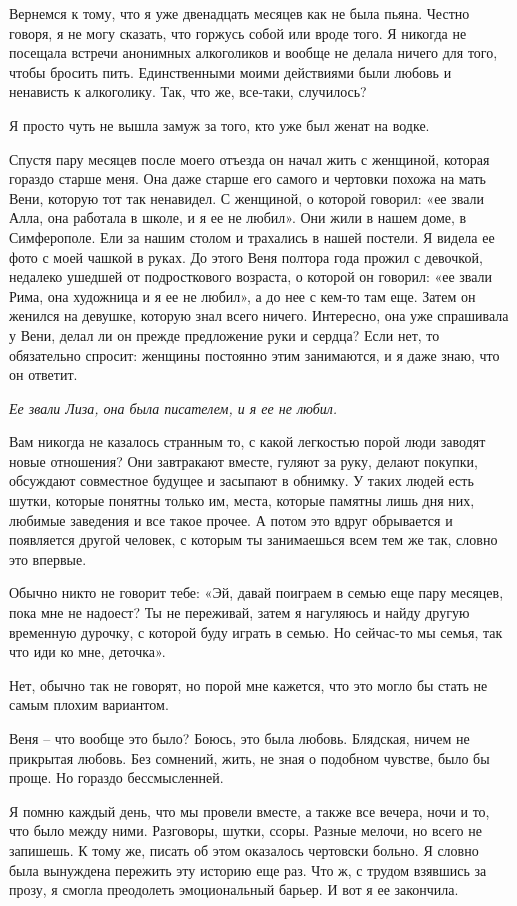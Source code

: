\documentclass[
]{book}
\begin{document}
Вернемся к тому, что я уже двенадцать месяцев как не была пьяна. Честно говоря, я не могу сказать, что горжусь собой или вроде того. Я никогда не посещала встречи анонимных алкоголиков и вообще не делала ничего для того, чтобы бросить пить. Единственными моими действиями были любовь и ненависть к алкоголику. Так, что же, все-таки, случилось?

Я просто чуть не вышла замуж за того, кто уже был женат на водке.

Спустя пару месяцев после моего отъезда он начал жить с женщиной, которая гораздо старше меня. Она даже старше его самого и чертовки похожа на мать Вени, которую тот так ненавидел. С женщиной, о которой говорил: «ее звали Алла, она работала в школе, и я ее не любил». Они жили в нашем доме, в Симферополе. Ели за нашим столом и трахались в нашей постели. Я видела ее фото с моей чашкой в руках. До этого Веня полтора года прожил с девочкой, недалеко ушедшей от подросткового возраста, о которой он говорил: «ее звали Рима, она художница и я ее не любил», а до нее с кем-то там еще. Затем он женился на девушке, которую знал всего ничего. Интересно, она уже спрашивала у Вени, делал ли он прежде предложение руки и сердца? Если нет, то обязательно спросит: женщины постоянно этим занимаются, и я даже знаю, что он ответит.

\emph{Ее звали Лиза, она была писателем, и я ее не любил.}

Вам никогда не казалось странным то, с какой легкостью порой люди заводят новые отношения? Они завтракают вместе, гуляют за руку, делают покупки, обсуждают совместное будущее и засыпают в обнимку. У таких людей есть шутки, которые понятны только им, места, которые памятны лишь дня них, любимые заведения и все такое прочее. А потом это вдруг обрывается и появляется другой человек, с которым ты занимаешься всем тем же так, словно это впервые.

Обычно никто не говорит тебе: «Эй, давай поиграем в семью еще пару месяцев, пока мне не надоест? Ты не переживай, затем я нагуляюсь и найду другую временную дурочку, с которой буду играть в семью. Но сейчас-то мы семья, так что иди ко мне, деточка».

Нет, обычно так не говорят, но порой мне кажется, что это могло бы стать не самым плохим вариантом.

Веня -- что вообще это было? Боюсь, это была любовь. Блядская, ничем не прикрытая любовь. Без сомнений, жить, не зная о подобном чувстве, было бы проще. Но гораздо бессмысленней.

Я помню каждый день, что мы провели вместе, а также все вечера, ночи и то, что было между ними. Разговоры, шутки, ссоры. Разные мелочи, но всего не запишешь. К тому же, писать об этом оказалось чертовски больно. Я словно была вынуждена пережить эту историю еще раз. Что ж, с трудом взявшись за прозу, я смогла преодолеть эмоциональный барьер. И вот я ее закончила.
\end{document}
